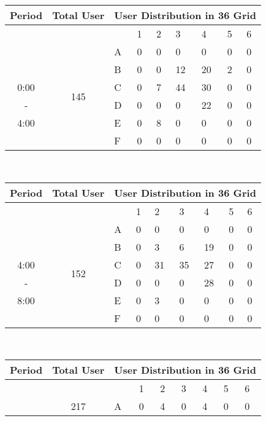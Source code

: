 \begin{table*}[hpt]	
\begin{minipage}{.5\linewidth}	
\centering	
\begin{tabular}{|c|c|p{0.4cm}|p{0.4cm}|p{0.4cm}|p{0.4cm}|p{0.4cm}|p{0.4cm}|p{0.4cm}|}	
\hline	
Period & Total User &\multicolumn{7}{c|}{User Distribution in 36 Grid} \\	
\hline	
&& & 1 &2 & 3 & 4 & 5&6\\	
\cline{3-9}	
 & \multirow{7}{*}{145}	
 &A	
& 0& 0& 0& 0& 0& 0  \\	
\cline{3-9}	
 && B	
& 0& 0& 12& 20& 2& 0  \\	
\cline{3-9}	
0:00 && C	
& 0& 7& 44& 30& 0& 0  \\	
\cline{3-9}	
 -&& D 	
& 0& 0& 0& 22& 0& 0  \\	
\cline{3-9}	
4:00 && E 	
& 0& 8& 0& 0& 0& 0  \\	
\cline{3-9}	
 && F 	
& 0& 0& 0& 0& 0& 0  \\	
\hline	
\end{tabular}	
\vspace*{0.1in} \\	
\begin{tabular}{|c|c|p{0.4cm}|p{0.4cm}|p{0.4cm}|p{0.4cm}|p{0.4cm}|p{0.4cm}|p{0.4cm}|}	
\hline	
Period & Total User &\multicolumn{7}{c|}{User Distribution in 36 Grid} \\	
\hline	
&& & 1 &2 & 3 & 4 & 5&6\\	
\cline{3-9}	
 & \multirow{7}{*}{152}	
 &A	
& 0& 0& 0& 0& 0& 0  \\	
\cline{3-9}	
 && B	
& 0& 3& 6& 19& 0& 0  \\	
\cline{3-9}	
4:00 && C	
& 0& 31& 35& 27& 0& 0  \\	
\cline{3-9}	
 -&& D 	
& 0& 0& 0& 28& 0& 0  \\	
\cline{3-9}	
8:00 && E 	
& 0& 3& 0& 0& 0& 0  \\	
\cline{3-9}	
 && F 	
& 0& 0& 0& 0& 0& 0  \\	
\hline	
\end{tabular}	
\vspace*{0.1in} \\	
\begin{tabular}{|c|c|p{0.4cm}|p{0.4cm}|p{0.4cm}|p{0.4cm}|p{0.4cm}|p{0.4cm}|p{0.4cm}|}	
\hline	
Period & Total User &\multicolumn{7}{c|}{User Distribution in 36 Grid} \\	
\hline	
&& & 1 &2 & 3 & 4 & 5&6\\	
\cline{3-9}	
 & \multirow{7}{*}{217}	
 &A	
& 0& 4& 0& 4& 0& 0  \\	

\end{tabular}
\end{minipage}
\end{table*}
